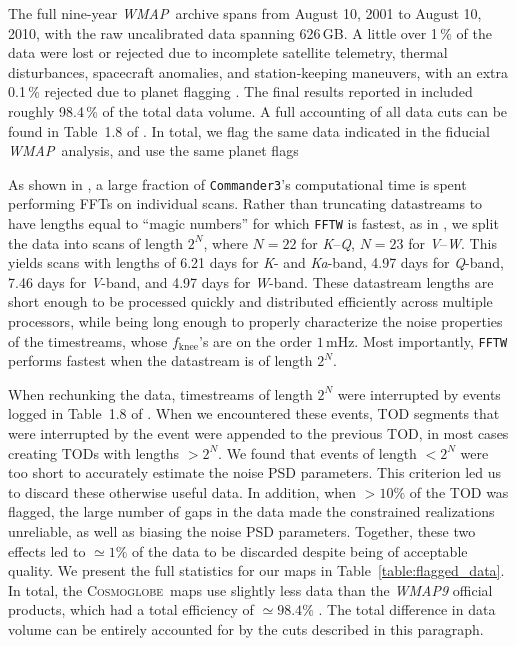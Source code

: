 \documentclass[twocolumn]{../../common/aa}
\def\WMAP{\emph{WMAP}}
\def\commanderthree{\texttt{Commander3}}
\newcommand{\Cosmoglobe}{\textsc{Cosmoglobe}}
\newcommand{\K}[0]{\textit K}
\newcommand{\Ka}[0]{\textit{Ka}}
\newcommand{\Q}[0]{\textit Q}
\newcommand{\V}[0]{\textit V}
\newcommand{\W}[0]{\textit W}
\begin{document}

The full nine-year \WMAP\ archive spans from August 10, 2001 to August 10, 2010, with the raw uncalibrated data spanning 626\,GB. A little over 1\,\% of the data were lost or rejected due to incomplete satellite telemetry, thermal disturbances, spacecraft anomalies, and station-keeping maneuvers, with an extra 0.1\,\% rejected due to planet flagging \citep{bennett2003a,hinshaw2007,hinshaw2009,bennett2012}. 
The final results reported in \citet{bennett2012} included roughly 98.4\,\% of the total data volume.
A full accounting of all data cuts can be found in Table~1.8 of \citet{wmapexsupp}. In total, we flag the same data indicated in the fiducial \WMAP\ analysis, and use the same planet flags

As shown in \citet{bp03}, a large fraction of \commanderthree's computational time is spent performing FFTs on individual scans. Rather than truncating datastreams to have lengths equal to ``magic numbers'' for which \texttt{FFTW} \citep{FFTW05} is fastest, as in \citet{bp03}, 
we split the data into scans of length $2^N$, where $N=22$ for \K--\Q, $N=23$ for \V--\W. This yields scans with lengths of 6.21 days for \K- and \Ka-band, 4.97 days for \Q-band, 7.46 days for \V-band, and 4.97 days for \W-band.
These datastream lengths are short enough to be processed quickly and distributed efficiently across multiple processors, while being long enough to properly characterize the noise properties of the timestreams, whose $f_\mathrm{knee}$'s are on the order $1\,\mathrm{mHz}$. Most importantly, \texttt{FFTW} performs fastest when the datastream is of length $2^N$.

When rechunking the data, timestreams of length $2^N$ were interrupted by events logged in Table~1.8 of \citet{wmapexsupp}.
When we encountered these events, TOD segments that were interrupted by the event were appended to the previous TOD, in most cases creating TODs with lengths $>2^N$. We found that events of length $<2^N$ were too short to accurately estimate the noise PSD parameters. This criterion led us to discard these otherwise useful data. In addition, when $>10\%$ of the TOD was flagged, the large number of gaps in the data made the constrained realizations unreliable, as well as biasing the noise PSD parameters. Together, these two effects led to $\simeq1\%$ of the data to be discarded despite being of acceptable quality. We present the full statistics for our maps in Table~\ref{table:flagged_data}. In total, the \Cosmoglobe\ maps use slightly less data than the \textit{WMAP9} official products, which had a total efficiency of $\simeq98.4\%$ \citep{bennett2012}. The total difference in data volume can be entirely accounted for by the cuts described in this paragraph.
\end{document}
